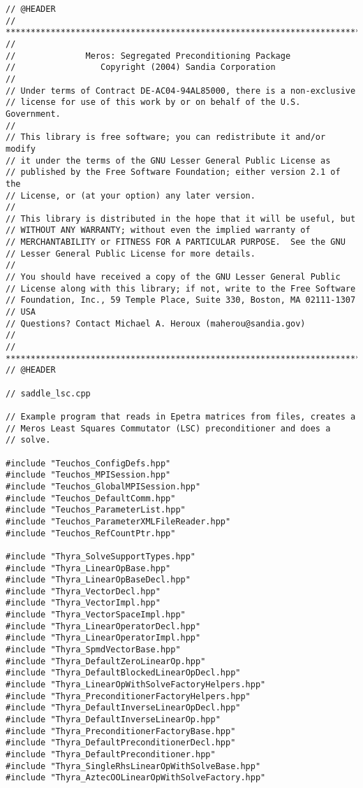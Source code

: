 \begin{verbatim}
// @HEADER
// ***********************************************************************
// 
//              Meros: Segregated Preconditioning Package
//                 Copyright (2004) Sandia Corporation
// 
// Under terms of Contract DE-AC04-94AL85000, there is a non-exclusive
// license for use of this work by or on behalf of the U.S. Government.
// 
// This library is free software; you can redistribute it and/or modify
// it under the terms of the GNU Lesser General Public License as
// published by the Free Software Foundation; either version 2.1 of the
// License, or (at your option) any later version.
//  
// This library is distributed in the hope that it will be useful, but
// WITHOUT ANY WARRANTY; without even the implied warranty of
// MERCHANTABILITY or FITNESS FOR A PARTICULAR PURPOSE.  See the GNU
// Lesser General Public License for more details.
//  
// You should have received a copy of the GNU Lesser General Public
// License along with this library; if not, write to the Free Software
// Foundation, Inc., 59 Temple Place, Suite 330, Boston, MA 02111-1307
// USA
// Questions? Contact Michael A. Heroux (maherou@sandia.gov) 
// 
// ***********************************************************************
// @HEADER

// saddle_lsc.cpp

// Example program that reads in Epetra matrices from files, creates a
// Meros Least Squares Commutator (LSC) preconditioner and does a
// solve.

#include "Teuchos_ConfigDefs.hpp"
#include "Teuchos_MPISession.hpp"
#include "Teuchos_GlobalMPISession.hpp"
#include "Teuchos_DefaultComm.hpp"
#include "Teuchos_ParameterList.hpp"
#include "Teuchos_ParameterXMLFileReader.hpp"
#include "Teuchos_RefCountPtr.hpp"

#include "Thyra_SolveSupportTypes.hpp"
#include "Thyra_LinearOpBase.hpp"
#include "Thyra_LinearOpBaseDecl.hpp"
#include "Thyra_VectorDecl.hpp"
#include "Thyra_VectorImpl.hpp" 
#include "Thyra_VectorSpaceImpl.hpp"
#include "Thyra_LinearOperatorDecl.hpp"
#include "Thyra_LinearOperatorImpl.hpp"
#include "Thyra_SpmdVectorBase.hpp"
#include "Thyra_DefaultZeroLinearOp.hpp"
#include "Thyra_DefaultBlockedLinearOpDecl.hpp"
#include "Thyra_LinearOpWithSolveFactoryHelpers.hpp"
#include "Thyra_PreconditionerFactoryHelpers.hpp"
#include "Thyra_DefaultInverseLinearOpDecl.hpp"
#include "Thyra_DefaultInverseLinearOp.hpp"
#include "Thyra_PreconditionerFactoryBase.hpp"
#include "Thyra_DefaultPreconditionerDecl.hpp"
#include "Thyra_DefaultPreconditioner.hpp"
#include "Thyra_SingleRhsLinearOpWithSolveBase.hpp"
#include "Thyra_AztecOOLinearOpWithSolveFactory.hpp"


\end{verbatim}
